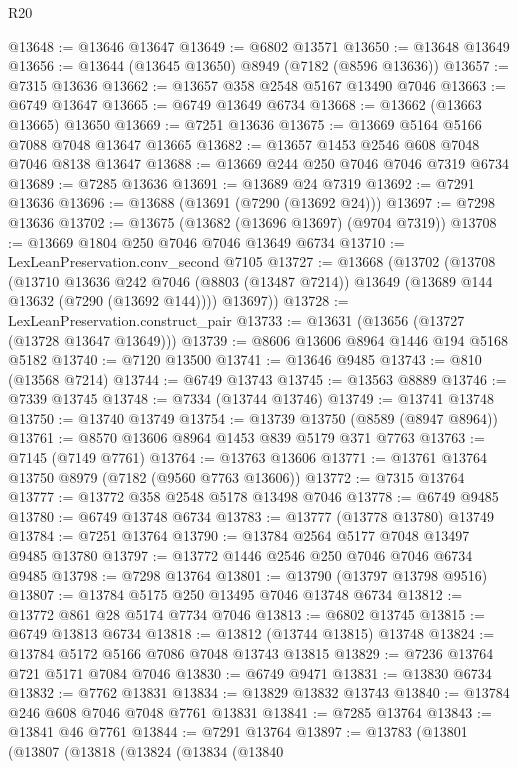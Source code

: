 \begin{lexlean}{R20}
\begin{coremodule}
{@13648 := @13646 @13647
@13649 := @6802 @13571
@13650 := @13648 @13649
@13656 := @13644 (@13645 @13650) @8949 (@7182 (@8596 @13636))
@13657 := @7315 @13636
@13662 := @13657 @358 @2548 @5167 @13490 @7046
@13663 := @6749 @13647
@13665 := @6749 @13649 @6734
@13668 := @13662 (@13663 @13665) @13650
@13669 := @7251 @13636
@13675 := @13669 @5164 @5166 @7088 @7048 @13647 @13665
@13682 := @13657 @1453 @2546 @608 @7048 @7046 @8138 @13647
@13688 := @13669 @244 @250 @7046 @7046 @7319 @6734
@13689 := @7285 @13636
@13691 := @13689 @24 @7319
@13692 := @7291 @13636
@13696 := @13688 (@13691 (@7290 (@13692 @24)))
@13697 := @7298 @13636
@13702 := @13675 (@13682 (@13696 @13697) (@9704 @7319))
@13708 := @13669 @1804 @250 @7046 @7046 @13649 @6734
@13710 := LexLeanPreservation.conv_second @7105
@13727 := @13668
    (@13702
      (@13708
        (@13710
          @13636
          @242
          @7046
          (@8803 (@13487 @7214))
          @13649
          (@13689 @144 @13632 (@7290 (@13692 @144))))
        @13697))
@13728 := LexLeanPreservation.construct_pair
@13733 := @13631 (@13656 (@13727 (@13728 @13647 @13649)))
@13739 := @8606 @13606 @8964 @1446 @194 @5168 @5182
@13740 := @7120 @13500
@13741 := @13646 @9485
@13743 := @810 (@13568 @7214)
@13744 := @6749 @13743
@13745 := @13563 @8889
@13746 := @7339 @13745
@13748 := @7334 (@13744 @13746)
@13749 := @13741 @13748
@13750 := @13740 @13749
@13754 := @13739 @13750 (@8589 (@8947 @8964))
@13761 := @8570 @13606 @8964 @1453 @839 @5179 @371 @7763
@13763 := @7145 (@7149 @7761)
@13764 := @13763 @13606
@13771 := @13761 @13764 @13750 @8979 (@7182 (@9560 @7763 @13606))
@13772 := @7315 @13764
@13777 := @13772 @358 @2548 @5178 @13498 @7046
@13778 := @6749 @9485
@13780 := @6749 @13748 @6734
@13783 := @13777 (@13778 @13780) @13749
@13784 := @7251 @13764
@13790 := @13784 @2564 @5177 @7048 @13497 @9485 @13780
@13797 := @13772 @1446 @2546 @250 @7046 @7046 @6734 @9485
@13798 := @7298 @13764
@13801 := @13790 (@13797 @13798 @9516)
@13807 := @13784 @5175 @250 @13495 @7046 @13748 @6734
@13812 := @13772 @861 @28 @5174 @7734 @7046
@13813 := @6802 @13745
@13815 := @6749 @13813 @6734
@13818 := @13812 (@13744 @13815) @13748
@13824 := @13784 @5172 @5166 @7086 @7048 @13743 @13815
@13829 := @7236 @13764 @721 @5171 @7084 @7046
@13830 := @6749 @9471
@13831 := @13830 @6734
@13832 := @7762 @13831
@13834 := @13829 @13832 @13743
@13840 := @13784 @246 @608 @7046 @7048 @7761 @13831
@13841 := @7285 @13764
@13843 := @13841 @46 @7761
@13844 := @7291 @13764
@13897 := @13783
    (@13801
      (@13807
        (@13818
          (@13824
            (@13834
              (@13840
}
\end{coremodule}
\end{lexlean}
